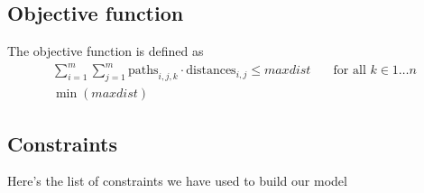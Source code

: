 \documentclass{article}
\begin{document}
\subsection{Objective function}
The objective function is defined as %
\begin{align*}
	\sum_{i=1}^m \sum_{j=1}^m \text{paths}_{i,j,k} \cdot \text{distances}_{i,j} \le maxdist \quad & \text{for all } k \in 1 \ldots n \\
	\min({maxdist})
\end{align*} 
\subsection{Constraints}
Here's the list of constraints we have used to build our model
\end{document}
